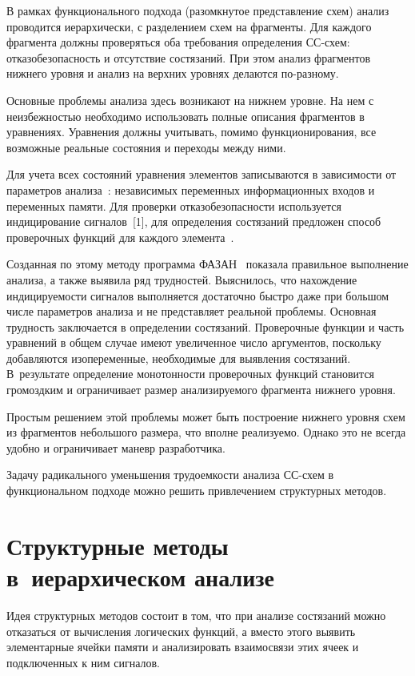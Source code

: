 \begin{multicols}{2}
  В рамках функционального подхода (разомкнутое представление схем)
анализ проводится иерархически, с разделением схем на фрагменты. Для
каждого фрагмента должны проверяться оба требования определения СС-схем:
отказобезопасность и отсутствие состязаний. При этом анализ фрагментов
нижнего уровня и анализ на верхних уровнях делаются по-раз\-ному.

  Основные проблемы анализа здесь возникают на нижнем уровне. На нем с
неизбежностью необходимо использовать полные описания фрагментов в
уравнениях. Уравнения должны учитывать, помимо функционирования, все
возможные реальные состояния и переходы между ними.

  Для учета всех состояний уравнения элементов записываются в зависимости
от параметров анализа~\cite{15-p, 16-p}: независимых переменных
информационных входов и переменных памяти. Для проверки
отказобезопасности используется индицирование сигналов~[1], для определения
состязаний предложен способ проверочных функций для каждого
  элемента~\cite{5-p, 16-p}.

  Созданная по этому методу программа \mbox{ФАЗАН}~\cite{17-p} показала
правильное выполнение анализа, а также выявила ряд трудностей. Выяснилось,
что нахождение индицируемости сигналов выполняется достаточно быстро
даже при большом чис\-ле параметров анализа и не представляет реальной
проб\-ле\-мы.
%
  Основная трудность заключается в определении состязаний. Проверочные
функции и часть уравнений в общем случае имеют увеличенное число
аргументов, поскольку добавляются изопеременные, необходимые для
выявления состязаний. В~результате определение мо\-но\-тон\-ности проверочных
функций становится громоздким и ограничивает размер анализируемого
фрагмента нижнего \mbox{уровня}.

  Простым решением этой проблемы может быть построение нижнего уровня
схем из фрагментов небольшого размера, что вполне реализуемо. Однако это не
всегда удобно и ограничивает маневр разработчика.

  Задачу радикального уменьшения трудоемкости анализа СС-схем в
функциональном подходе можно решить привлечением структурных методов.

\section{Структурные методы в~иерархическом анализе}

  Идея структурных методов состоит в том, что при анализе состязаний можно
отказаться от вычисления логических функций, а вместо этого выявить
элементарные ячейки памяти и анализировать взаимосвязи этих ячеек и
подключенных к ним сигналов.


\end{multicols}
